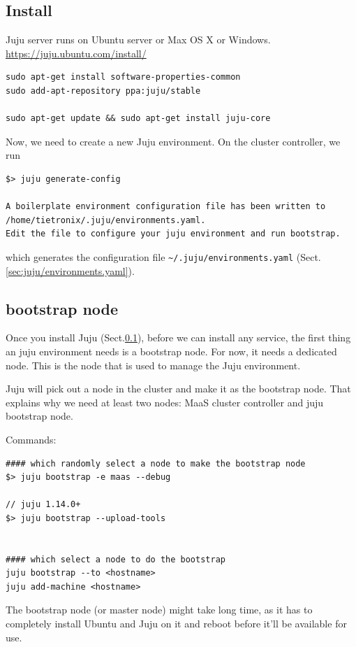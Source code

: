 \subsection{Install}
\label{sec:Juju_install}

Juju server runs on Ubuntu server or Max OS X or Windows.
\url{https://juju.ubuntu.com/install/}
\begin{verbatim}
sudo apt-get install software-properties-common
sudo add-apt-repository ppa:juju/stable

sudo apt-get update && sudo apt-get install juju-core
\end{verbatim}


Now, we need to create a new Juju environment.  On the cluster controller, we
run
\begin{verbatim}
$> juju generate-config

A boilerplate environment configuration file has been written to /home/tietronix/.juju/environments.yaml.
Edit the file to configure your juju environment and run bootstrap.
\end{verbatim}
which generates the configuration file \verb!~/.juju/environments.yaml!
(Sect.\ref{sec:juju/environments.yaml}).

\subsection{bootstrap node}
\label{sec:juju_bootstrap_node}

Once you install Juju (Sect.\ref{sec:Juju_install}), before we can install any
service, the first thing an juju environment needs is a bootstrap node. For now,
it needs a dedicated node.  This is the node that is used to manage the
Juju environment.

Juju will pick out a node in the cluster and make it as the bootstrap node. That
explains why we need at least two nodes: MaaS cluster controller and juju
bootstrap node.

Commands: 
\begin{verbatim}
#### which randomly select a node to make the bootstrap node
$> juju bootstrap -e maas --debug

// juju 1.14.0+
$> juju bootstrap --upload-tools


#### which select a node to do the bootstrap
juju bootstrap --to <hostname>
juju add-machine <hostname>
\end{verbatim}

The bootstrap node (or master node) might take long time, as it has to
completely install Ubuntu and Juju on it and reboot before it'll be  available
for use.


